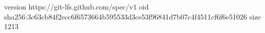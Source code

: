 version https://git-lfs.github.com/spec/v1
oid sha256:3c63cb84f2ecc6f6573664b595533d3ce53f96841d7b07c4f4511cf6f6e51026
size 1213
